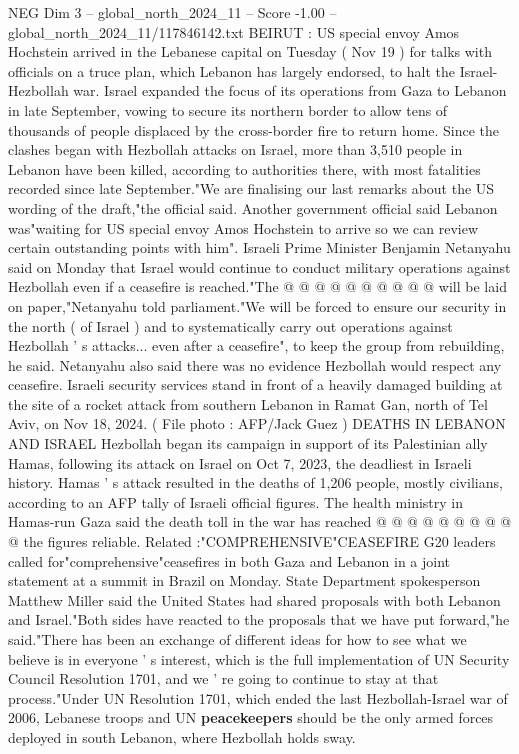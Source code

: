 \begin{textsample}{NEG Dim 3 – global\_north\_2024\_11 – Score -1.00 – global\_north\_2024\_11/117846142.txt}  \label{ex:f3_neg_287}
BEIRUT : US special envoy Amos Hochstein arrived in the Lebanese capital on Tuesday ( Nov 19 ) for talks with officials on a truce plan, which Lebanon has largely endorsed, to halt the Israel-Hezbollah war.
Israel expanded the focus of its operations from Gaza to Lebanon in late September, vowing to secure its northern border to allow tens of thousands of people displaced by the cross-border fire to return home.
Since the clashes began with Hezbollah attacks on Israel, more than 3,510 people in Lebanon have been killed, according to authorities there, with most fatalities recorded since late September."We are finalising our last remarks about the US wording of the draft,"the official said.
Another government official said Lebanon was"waiting for US special envoy Amos Hochstein to arrive so we can review certain outstanding points with him".
Israeli Prime Minister Benjamin Netanyahu said on Monday that Israel would continue to conduct military operations against Hezbollah even if a ceasefire is reached."The @ @ @ @ @ @ @ @ @ @ will be laid on paper,"Netanyahu told parliament."We will be forced to ensure our security in the north ( of Israel ) and to systematically carry out operations against Hezbollah ' s attacks... even after a ceasefire", to keep the group from rebuilding, he said.
Netanyahu also said there was no evidence Hezbollah would respect any ceasefire.
Israeli security services stand in front of a heavily damaged building at the site of a rocket attack from southern Lebanon in Ramat Gan, north of Tel Aviv, on Nov 18, 2024. ( File photo : AFP/Jack Guez ) DEATHS IN LEBANON AND ISRAEL Hezbollah began its campaign in support of its Palestinian ally Hamas, following its attack on Israel on Oct 7, 2023, the deadliest in Israeli history.
Hamas ' s attack resulted in the deaths of 1,206 people, mostly civilians, according to an AFP tally of Israeli official figures.
The health ministry in Hamas-run Gaza said the death toll in the war has reached @ @ @ @ @ @ @ @ @ @ the figures reliable.
Related :"COMPREHENSIVE"CEASEFIRE G20 leaders called for"comprehensive"ceasefires in both Gaza and Lebanon in a joint statement at a summit in Brazil on Monday.
State Department spokesperson Matthew Miller said the United States had shared proposals with both Lebanon and Israel."Both sides have reacted to the proposals that we have put forward,"he said."There has been an exchange of different ideas for how to see what we believe is in everyone ' s interest, which is the full implementation of UN Security Council Resolution 1701, and we ' re going to continue to stay at that process."Under UN Resolution 1701, which ended the last Hezbollah-Israel war of 2006, Lebanese troops and UN \textbf{peacekeepers} should be the only armed forces deployed in south Lebanon, where Hezbollah holds sway.

\end{textsample}

